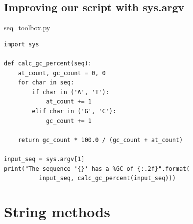 \documentclass[aspectratio=1610,slidestop]{beamer}
\begin{document}
\subsection{Improving our script with sys.argv}
\begin{pframe}
 \begin{pythonfile}{seq\_toolbox.py}
  \begin{verbatim}
import sys

def calc_gc_percent(seq):
    at_count, gc_count = 0, 0
    for char in seq:
        if char in ('A', 'T'):
            at_count += 1
        elif char in ('G', 'C'):
            gc_count += 1

    return gc_count * 100.0 / (gc_count + at_count)

input_seq = sys.argv[1]
print("The sequence '{}' has a %GC of {:.2f}".format(
          input_seq, calc_gc_percent(input_seq)))
  \end{verbatim}
 \end{pythonfile}
\end{pframe}



\section{String methods}
\end{document}
